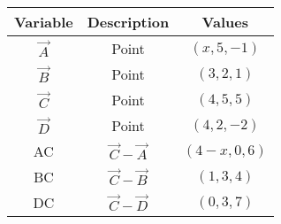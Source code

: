 
\begin{tabular}[12pt]{ |c| c| c|}
    \hline
    \textbf{Variable} & \textbf{Description} & \textbf{Values} \\ 
    \hline
    $\vec{A}$ & Point & $(x,5,-1)$ \\
    \hline
    $\vec{B}$ & Point & $(3,2,1)$ \\
    \hline
    $\vec{C}$ & Point & $(4,5,5)$ \\
    \hline
    $\vec{D}$ & Point & $(4,2,-2)$ \\
    \hline
    AC & $\vec{C}-\vec{A}$ & $(4-x,0,6)$ \\
    \hline
    BC & $\vec{C}-\vec{B}$ & $(1,3,4)$ \\
    \hline
    DC & $\vec{C}-\vec{D}$ & $(0,3,7)$ \\
    \hline
    \end{tabular}

